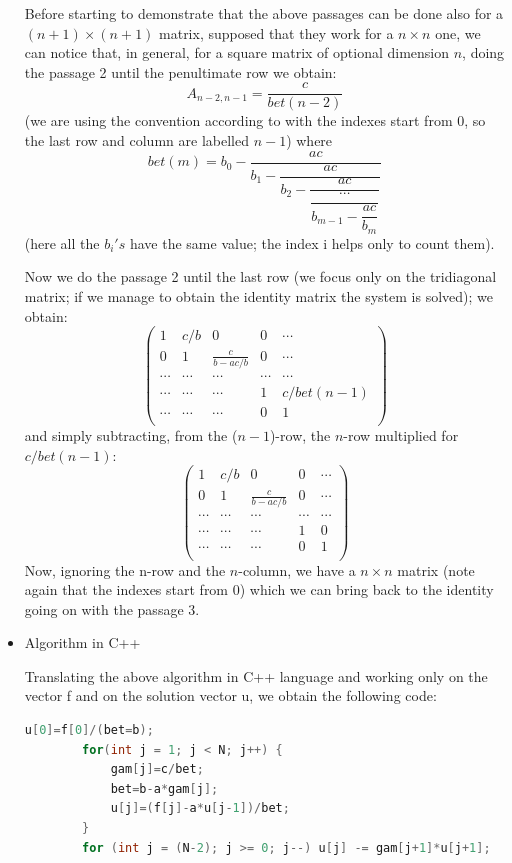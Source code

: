 \documentclass {article}
\begin{document}
\begin{itemize}
	Before starting to demonstrate that the above passages can be done also for a $(n+1) \times (n+1)$ matrix, supposed that they work for a $n \times n$ one, we can notice that, in general, for a square matrix of optional dimension $n$, doing the passage 2 until the penultimate row we obtain:
	$$A_{n-2,n-1}=\frac{c}{bet(n-2)}$$
	(we are using the convention according to with the indexes start from $0$, so the last row and column are labelled $n-1$) where 
	$$bet(m)=b_0-\dfrac{ac}{b_1-\dfrac{ac}{b_2-\dfrac{ac}{\dfrac{\cdots}{b_{m-1}-\dfrac{ac}{b_m}}}}}$$
	(here all the $b_i's$ have the same value; the index i helps only to count them).
	
	Now we do the passage 2 until the last row (we focus only on the tridiagonal matrix; if we manage to obtain the identity matrix the system is solved); we obtain:
	\begin{equation}
	\left(
	\begin{array}{ccccc}
	  1 & c/b & 0 & 0 & \cdots \\
	  0 & 1 & \frac{c}{b-ac/b} & 0 & \cdots \\
	  \cdots & \cdots & \cdots & \cdots & \cdots \\
	  \cdots & \cdots & \cdots & 1 & c/bet(n-1) \\
	  \cdots & \cdots & \cdots & 0 & 1 \\
	\end{array}
	\right)
	\end{equation}
	and simply subtracting, from the ($n-1$)-row, the $n$-row multiplied for $c/bet(n-1)$:
	\begin{equation}
	\left(
	\begin{array}{ccccc}
	  1 & c/b & 0 & 0 & \cdots \\
	  0 & 1 & \frac{c}{b-ac/b} & 0 & \cdots \\
	  \cdots & \cdots & \cdots & \cdots & \cdots \\
	  \cdots & \cdots & \cdots & 1 & 0 \\
	  \cdots & \cdots & \cdots & 0 & 1 \\
	\end{array}
	\right)
	\end{equation}
	Now, ignoring the n-row and the $n$-column, we have a $n \times n$ matrix (note again that the indexes start from $0$) which we can bring back to the identity going on with the passage 3.

\item Algorithm in C++

	Translating the above algorithm in C++ language and working only on the vector f and on the solution vector u, we obtain the following code:
	\begin{lstlisting}[language=cpp]
		u[0]=f[0]/(bet=b);
	    for(int j = 1; j < N; j++) {
	        gam[j]=c/bet;
	        bet=b-a*gam[j];
	        u[j]=(f[j]-a*u[j-1])/bet;
	    }
	    for (int j = (N-2); j >= 0; j--) u[j] -= gam[j+1]*u[j+1];
	\end{lstlisting}

\end{itemize}
\end{document}
